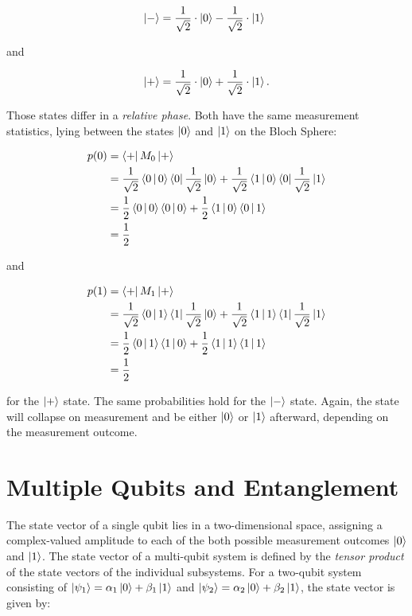 \begin{equation}
  \Ket{-} = \frac{1}{\sqrt{2}} \cdot \Ket{0} - \frac{1}{\sqrt{2}} \cdot \Ket{1} \phantom{.}
\end{equation}

and

\begin{equation}
  \Ket{+} = \frac{1}{\sqrt{2}} \cdot \Ket{0} + \frac{1}{\sqrt{2}} \cdot \Ket{1}.
\end{equation}

Those states differ in a \textit{relative phase}. Both have the same measurement statistics, lying between the states $\Ket{0}$ and
$\Ket{1}$ on the Bloch Sphere:

\begin{align}
  p(0) &= \Bra{+} M_0 \Ket{+} \\
       &= \frac{1}{\sqrt{2}} \Braket{0|0} \Bra{0} \frac{1}{\sqrt{2}} \Ket{0} + \frac{1}{\sqrt{2}} \Braket{1|0} \Bra{0} \frac{1}{\sqrt{2}} \Ket{1} \\
       &= \frac{1}{2} \Braket{0|0} \Braket{0|0} + \frac{1}{2} \Braket{1|0} \Braket{0|1} \\
       &= \frac{1}{2}
\end{align}


and

\begin{align}
  p(1) &= \Bra{+} M_1 \Ket{+} \\
       &= \frac{1}{\sqrt{2}} \Braket{0|1} \Bra{1} \frac{1}{\sqrt{2}} \Ket{0} + \frac{1}{\sqrt{2}} \Braket{1|1} \Bra{1} \frac{1}{\sqrt{2}} \Ket{1} \\
       &= \frac{1}{2} \Braket{0|1} \Braket{1|0} + \frac{1}{2} \Braket{1|1} \Braket{1|1} \\
       &= \frac{1}{2}
\end{align}



for the $\Ket{+}$ state. The same probabilities hold for the
$\Ket{-}$ state.
Again, the state will collapse on measurement and be either $\Ket{0}$ or $\Ket{1}$ afterward, depending on the measurement outcome.

\section{Multiple Qubits and Entanglement}
\label{sec:multiplequbitsandentanglement}

The state vector of a single qubit lies in a two-dimensional 
space, assigning a complex-valued amplitude to each of the both possible measurement outcomes
$\Ket{0}$ and $\Ket{1}$. The state vector of a multi-qubit system is defined by
the \textit{tensor product} of the state vectors of the individual subsystems.
For a two-qubit system consisting of $\Ket{\psi_1} = \alpha_1 \Ket{0} + \beta_1
\Ket{1}$ and $\Ket{\psi_2} = \alpha_2 \Ket{0} + \beta_2 \Ket{1}$, the state vector
is given by:

